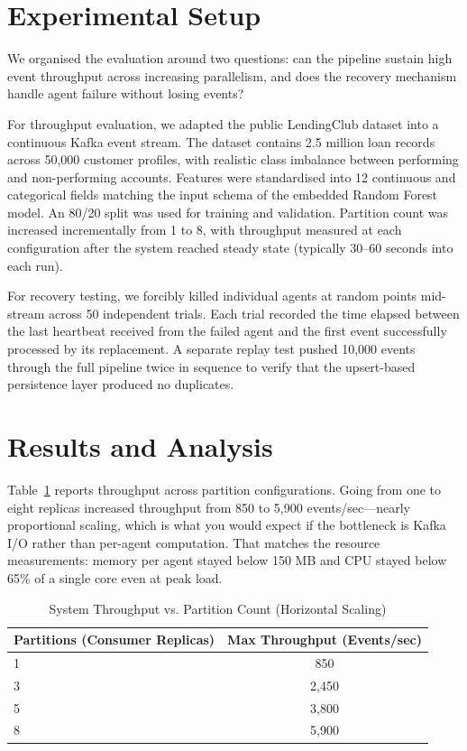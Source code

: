 \documentclass[runningheads]{llncs}
\begin{document}
\section{Experimental Setup}

We organised the evaluation around two questions: can the pipeline sustain high event throughput across increasing parallelism, and does the recovery mechanism handle agent failure without losing events?

For throughput evaluation, we adapted the public LendingClub dataset into a continuous Kafka event stream. The dataset contains 2.5 million loan records across 50,000 customer profiles, with realistic class imbalance between performing and non-performing accounts. Features were standardised into 12 continuous and categorical fields matching the input schema of the embedded Random Forest model. An 80/20 split was used for training and validation. Partition count was increased incrementally from 1 to 8, with throughput measured at each configuration after the system reached steady state (typically 30--60 seconds into each run).

For recovery testing, we forcibly killed individual agents at random points mid-stream across 50 independent trials. Each trial recorded the time elapsed between the last heartbeat received from the failed agent and the first event successfully processed by its replacement. A separate replay test pushed 10,000 events through the full pipeline twice in sequence to verify that the upsert-based persistence layer produced no duplicates.

\section{Results and Analysis}

Table~\ref{tab:scaling} reports throughput across partition configurations. Going from one to eight replicas increased throughput from 850 to 5,900 events/sec---nearly proportional scaling, which is what you would expect if the bottleneck is Kafka I/O rather than per-agent computation. That matches the resource measurements: memory per agent stayed below 150 MB and CPU stayed below 65\% of a single core even at peak load.

\begin{table}[ht]
\centering
\caption{System Throughput vs. Partition Count (Horizontal Scaling)}
\label{tab:scaling}
\begin{tabular}{@{}lc@{}}
\toprule
\textbf{Partitions (Consumer Replicas)} & \textbf{Max Throughput (Events/sec)} \\ \midrule
1 & 850 \\
3 & 2,450 \\
5 & 3,800 \\
8 & 5,900 \\ \bottomrule
\end{tabular}
\end{table}
\end{document}
